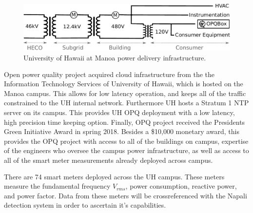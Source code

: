 \begin{figure}[h]
	\centering
	\includegraphics[width=1\linewidth]{img/uh-grid.pdf}	
	\caption{University of Hawaii at Manoa power delivery infrastructure.}
	\label{expdes:fig:3}
\end{figure}
Open power quality project acquired cloud infrastructure from the the Information Technology Services of University of Hawaii, which is hosted on the Manoa campus. This allows for low latency operation, and keeps all of the traffic constrained to the UH internal network. Furthermore UH hosts a Stratum 1 NTP server on its campus. This provides UH OPQ deployment with a low latency, high precision time keeping option. Finally, OPQ project received the Presidents Green Initiative Award in spring 2018. Besides a \$10,000 monetary award, this provides the OPQ project with access to all of the buildings on campus, expertise of the engineers who oversee the campus power infrastructure, as well as access to all of the smart meter measurements already deployed across campus. 

There are 74 smart meters deployed across the UH campus. These meters measure the fundamental frequency $V_{rms}$, power consumption, reactive power, and power factor. Data from these meters will be crossreferenced with the Napali detection system in order to ascertain it's capabilities.

